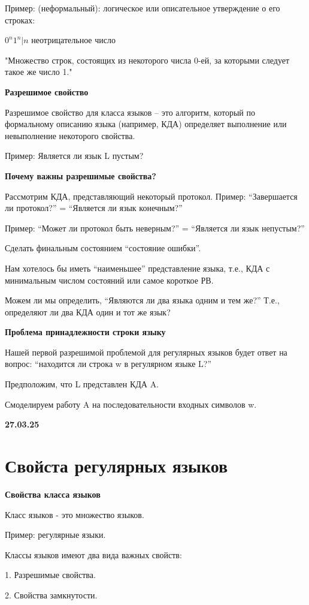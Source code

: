 \documentclass{article}
\begin{document}
Пример: (неформальный): логическое или описательное
утверждение о его строках:

{$0^n1^n|n$ неотрицательное число}

"Множество строк, состоящих из некоторого числа 0-ей, за которыми
следует такое же число 1."

\textbf{Разрешимое свойство}

Разрешимое свойство для класса языков – это алгоритм,
который по формальному описанию языка (например, КДА)
определяет выполнение или невыполнение некоторого
свойства.

Пример: Является ли язык L пустым?

\textbf{Почему важны разрешимые
свойства?}

Рассмотрим КДА, представляющий некоторый протокол.
Пример: “Завершается ли протокол?” = “Является ли язык
конечным?”

Пример: “Может ли протокол быть неверным?” = “Является ли
язык непустым?”

Сделать финальным состоянием “состояние ошибки”.

Нам хотелось бы иметь “наименьшее” представление языка, т.е.,
КДА с минимальным числом состояний или самое короткое РВ.

Можем ли мы определить, “Являются ли два языка одним и тем
же?”
Т.е., определяют ли два КДА один и тот же язык?
 
\textbf{Проблема принадлежности
строки языку}

Нашей первой разрешимой проблемой для регулярных
языков будет ответ на вопрос: “находится ли строка w в
регулярном языке L?”

Предположим, что L представлен КДА A.

Смоделируем работу A на последовательности входных
символов w.

\textbf{27.03.25}



\section{Свойста регулярных языков}

\textbf{Свойства класса языков}

Класс языков - это множество языков.

Пример: регулярные языки.

Классы языков имеют два вида важных свойств:

1. Разрешимые свойства.

2. Свойства замкнутости.
\end{document}
